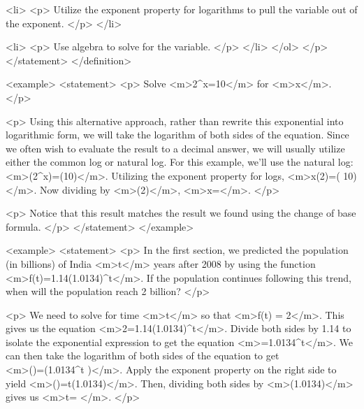                         <li>
                            <p>
                                Utilize the exponent property for logarithms to pull the variable out of the exponent.
                            </p>
                        </li>

                        <li>
                            <p>
                                Use algebra to solve for the variable.
                            </p>
                        </li>
                    </ol>
                </p>
            </statement>
        </definition>

        <example>
            <statement>
                <p>
                    Solve <m>2^{x}=10</m> for <m>x</m>.
                </p>

                <p>
                    Using this alternative approach, rather than rewrite this exponential into logarithmic form, we will take the logarithm of both sides of the equation.
                    Since we often wish to evaluate the result to a decimal answer, we will usually utilize either the common log or natural log.
                    For this example, we’ll use the natural log: <m>\ln⁡(2^{x})=\ln⁡(10)</m>.
                    Utilizing the exponent property for logs, <m>x\ln⁡(2)=\ln⁡( 10)</m>.
                    Now dividing by <m>\ln(2)</m>, <m>x=</m>.
                </p>

                <p>
                    Notice that this result matches the result we found using the change of base formula.
                </p>
            </statement>
        </example>

        <example>
            <statement>
                <p>
                    In the first section, we predicted the population (in billions) of India <m>t</m> years after 2008 by using the function <m>f(t)=1.14(1.0134)^{t}</m>.
                    If the population continues following this trend, when will the population reach 2 billion?
                </p>

                <p>
                    We need to solve for time <m>t</m> so that <m>f(t) = 2</m>.
                    This gives us the equation <m>2=1.14(1.0134)^{t}</m>.
                    Divide both sides by 1.14 to isolate the exponential expression to get the equation <m>=1.0134^{t}</m>.
                    We can then take the logarithm of both sides of the equation to get <m>\ln⁡()=\ln⁡(1.0134^{t} )</m>.
                    Apply the exponent property on the right side to yield <m>\ln⁡()=t\ln⁡(1.0134)</m>.
                    Then, dividing both sides by <m>\ln(1.0134)</m> gives us <m>t= </m>.
                </p>

